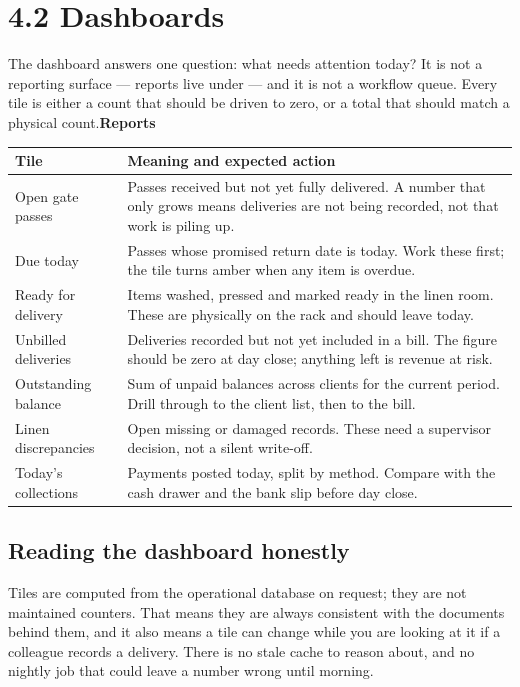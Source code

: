 \documentclass[11pt,a4paper,oneside]{book}
\begin{document}
\section{4.2 Dashboards}
The dashboard answers one question: what needs attention today? It is not a reporting surface — reports live under  — and it is not a workflow queue. Every tile is either a count that should be driven to zero, or a total that should match a physical count.\textbf{Reports}

\begin{center}\small
\begin{tabularx}{\linewidth}{|X|X|}
\hline
\rowcolor{lightgrey}
\textbf{Tile} & \textbf{Meaning and expected action} \\ \hline
Open gate passes & Passes received but not yet fully delivered. A number that only grows means deliveries are not being recorded, not that work is piling up. \\ \hline
Due today & Passes whose promised return date is today. Work these first; the tile turns amber when any item is overdue. \\ \hline
Ready for delivery & Items washed, pressed and marked ready in the linen room. These are physically on the rack and should leave today. \\ \hline
Unbilled deliveries & Deliveries recorded but not yet included in a bill. The figure should be zero at day close; anything left is revenue at risk. \\ \hline
Outstanding balance & Sum of unpaid balances across clients for the current period. Drill through to the client list, then to the bill. \\ \hline
Linen discrepancies & Open missing or damaged records. These need a supervisor decision, not a silent write-off. \\ \hline
Today's collections & Payments posted today, split by method. Compare with the cash drawer and the bank slip before day close. \\ \hline
\end{tabularx}
\end{center}
\subsection*{Reading the dashboard honestly}
Tiles are computed from the operational database on request; they are not maintained counters. That means they are always consistent with the documents behind them, and it also means a tile can change while you are looking at it if a colleague records a delivery. There is no stale cache to reason about, and no nightly job that could leave a number wrong until morning.
\end{document}

